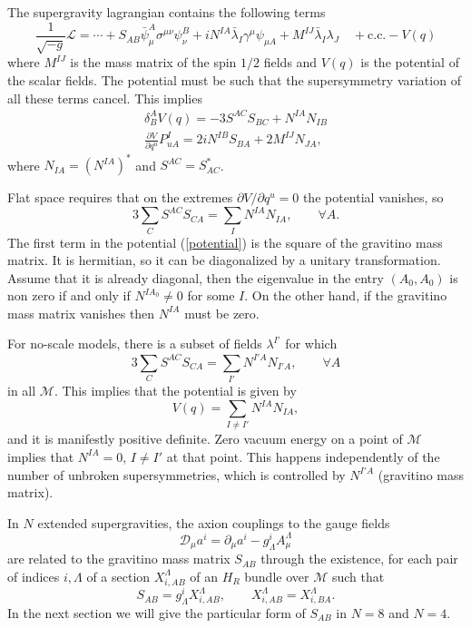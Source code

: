 \documentclass[a4paper,12pt]{article}
\begin{document}
 The supergravity lagrangian contains the following terms
 $$\frac{1}{\sqrt{-g}}\mathcal{L}=\cdots
+S_{AB}\bar\psi_\mu^A\sigma^{\mu\nu}\psi_\nu^B+iN^{IA}\bar\lambda_I\gamma^\mu\psi_{\mu A} +M^{IJ}
\bar\lambda_I\lambda_J \quad+\mathrm{c.c.}\! -\!V(q)$$
 where $M^{IJ}$ is the mass matrix of the spin $1/2$ fields and $V(q)$ is the potential of the scalar
fields. The potential must be such that the supersymmetry variation of all these terms cancel. This
implies \cite{fm,cgp2}
 \begin{eqnarray}\delta_B^AV(q)=-3 S^{AC}S_{BC}+N^{IA} N_{IB}\label{potential}\\
 \frac{\partial V}{\partial q^u}P_{uA}^I=2iN^{IB}S_{BA} +2M^{IJ} N_{JA},\nonumber\end{eqnarray}
 where $N_{IA}=(N^{IA})^*$ and $S^{AC}=S_{AC}^*$.

 Flat space requires that on the extremes ${\partial V}/{\partial q^u}=0$ the potential  vanishes, so
 $$3\sum_CS^{AC}S_{CA}=\sum_IN^{IA} N_{IA},\qquad \forall A.$$ The first term in the potential
(\ref{potential}) is the square of the gravitino mass matrix. It is hermitian, so it can be
diagonalized
by a unitary transformation. Assume that it is already diagonal, then the eigenvalue in the entry
$(A_0,A_0)$ is non zero if and only if   $N^{IA_0}\neq 0$ for some $I$. On the other hand, if the
gravitino mass matrix vanishes then $N^{IA}$ must be zero.

 For no-scale models, there is a subset of fields $\lambda^{I'}$ for which
 \begin{equation}3\sum_CS^{AC}S_{CA}=\sum_{I'}N^{I'A} N_{I'A},\qquad \forall
A\label{cancel}\end{equation}
in all $\mathcal{M}$. This implies that the potential is given by
 $$V(q)=\sum_{I\neq I'}N^{IA} N_{IA},$$
 and it is manifestly positive definite. Zero vacuum energy on a point of $\mathcal{M}$ implies that
$N^{IA}=0$, $I\neq I'$  at that point. This happens independently of the number of unbroken
supersymmetries, which is controlled by $N^{I'A}$ (gravitino mass matrix).

 In $N$ extended supergravities, the axion couplings  to the gauge fields
 $$\mathcal{D}_\mu a^i=\partial_\mu a^i-g_\Lambda^iA_\mu^\Lambda$$
 are related to the gravitino mass matrix $S_{AB}$ through the existence, for each pair of indices
$i,\Lambda$ of a section $X^\Lambda_{i,AB}$ of an $H_R$ bundle over $\mathcal{M}$ such that
 $$S_{AB}=g_\Lambda^iX_{i,AB}^\Lambda, \qquad X_{i,AB}^\Lambda=X_{i,BA}^\Lambda.$$
 In the next section we will give the particular form of $S_{AB}$ in $N=8$ and $N=4$.
\end{document}
